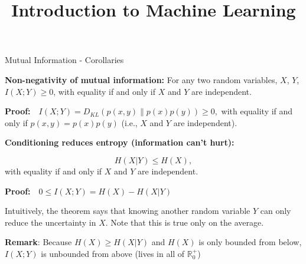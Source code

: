 \documentclass[11pt,compress,t,notes=noshow, xcolor=table]{beamer}
\title{Introduction to Machine Learning}
\date{}
\begin{document}

\begin{vbframe}{Mutual Information - Corollaries}

\small

\textbf{Non-negativity of mutual information:} For any two random variables, $X$, $Y$, $ I(X;Y) \geq 0$, with equality if and only if $X$ and $Y$ are independent. 

\lz

\textbf{Proof:}$\quad I(X ; Y)=D_{KL}(p(x, y) \| p(x) p(y)) \geq 0,$ with equality if and only if $p(x, y)=p(x) p(y)$ (i.e., $X$ and $Y$ are independent).

\lz
  
\textbf{Conditioning reduces entropy (information can't hurt):}

$$H(X | Y) \leq H(X),$$
with equality if and only if $X$ and $Y$ are independent.

\lz

\textbf{Proof:}$\quad 0 \leq I(X ; Y)=H(X)-H(X | Y)$

Intuitively, the theorem says that knowing another random variable $Y$ can only reduce the uncertainty in $X$. Note that this is true only on the average. 
\vspace{0.5cm}

\textbf{Remark}: Because $H(X)\geq H(X|Y)$ and $H(X)$ is only bounded from below, $I(X ; Y)$ is unbounded from above (lives in all of $\mathbb{R}_{0}^{+}$)

\framebreak







\end{vbframe}
\end{document}
